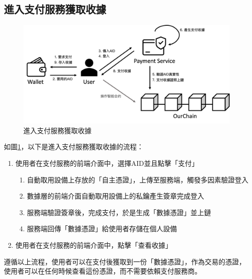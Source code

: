 \subsection{進入支付服務獲取收據}
\begin{figure}
  \centering
  \includegraphics[width=\linewidth, keepaspectratio]{figures/implement-2.png}
  \caption{進入支付服務獲取收據}
  \label{fig:implement-2}
\end{figure}
如圖\ref{fig:implement-2}，以下是進入支付服務獲取收據的流程：
\begin{enumerate}
  \item 使用者在支付服務的前端介面中，選擇AID並且點擊「支付」
        \begin{enumerate}
          \item 自動取用設備上存放的「自主憑證」，上傳至服務端，觸發多因素驗證登入
          \item 數據層的前端介面自動取用設備上的私鑰產生簽章完成登入
          \item 服務端驗證簽章後，完成支付，於是生成「數據憑證」並上鏈
          \item 服務端回傳「數據憑證」給使用者存儲在個人設備
        \end{enumerate}
  \item 使用者在支付服務的前端介面中，點擊「查看收據」
\end{enumerate}
遵循以上流程，使用者可以在支付後獲取到一份「數據憑證」，作為交易的憑證，使用者可以在任何時候查看這份憑證，而不需要依賴支付服務商。
